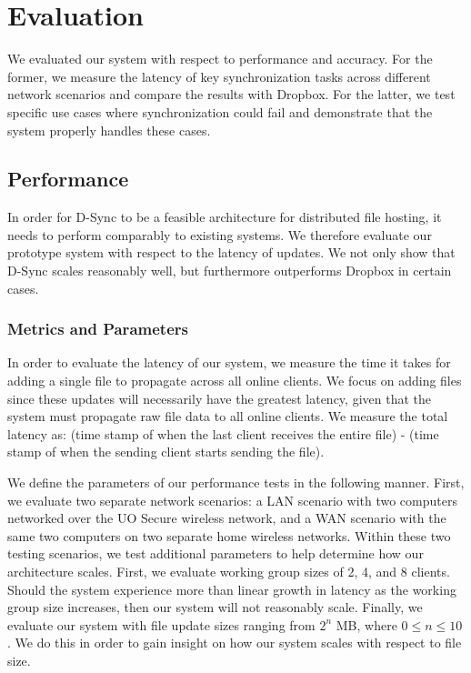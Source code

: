 \section{Evaluation}
\label{evaluation}
We evaluated our system with respect to performance and accuracy.
For the former, we measure the latency of key synchronization tasks
across different network scenarios and compare the results
with Dropbox. For the latter, we test specific use cases
where synchronization could fail and demonstrate that the system
properly handles these cases.

\subsection{Performance}
\label{evaluation.performance}
In order for D-Sync to be a feasible architecture
for distributed file hosting, it needs to perform comparably
to existing systems.
We therefore evaluate our prototype system with respect
to the latency of updates.
We not only show that D-Sync scales reasonably well,
but furthermore outperforms Dropbox in certain cases.

\subsubsection{Metrics and Parameters}
In order to evaluate the latency of our system,
we measure the time it takes for adding a single file to 
propagate across all online clients.
We focus on adding files since these updates will necessarily
have the greatest latency, given that the system
must propagate raw file data to all online clients.
We measure the total latency as: (time stamp of when the last client receives
the entire file) - (time stamp of when the sending client starts sending the file).

We define the parameters of our performance tests in the following manner.
First, we evaluate two separate network scenarios: a LAN scenario with
two computers networked over the UO Secure wireless network,
and a WAN scenario with the same two computers on two separate home
wireless networks. 
Within these two testing scenarios,
we test additional parameters to help determine how our architecture scales.
First, we evaluate working group sizes of 2, 4, and 8 clients.
Should the system experience more than linear growth in latency
as the working group size increases, then our system will not reasonably scale.
Finally, we evaluate our system with file update sizes ranging
from $2^n$ MB, where $0 \leq n \leq 10$.
We do this in order to gain insight on how our system scales
with respect to file size.

